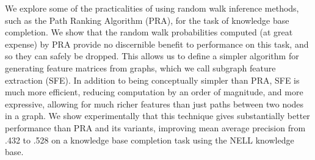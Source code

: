 We explore some of the practicalities of using random walk inference methods, such as the Path Ranking Algorithm (PRA), for the task of knowledge base completion. We show that the random walk probabilities computed (at great expense) by PRA provide no discernible benefit to performance on this task, and so they can safely be dropped. This allows us to define a simpler algorithm for generating feature matrices from graphs, which we call subgraph feature extraction (SFE). In addition to being conceptually simpler than PRA, SFE is much more efficient, reducing computation by an order of magnitude, and more expressive, allowing for much richer features than just paths between two nodes in a graph. We show experimentally that this technique gives substantially better performance than PRA and its variants, improving mean average precision from .432 to .528 on a knowledge base completion task using the NELL knowledge base.

